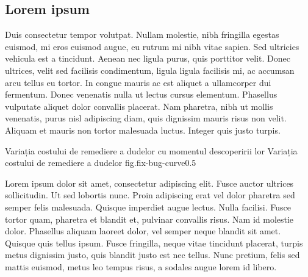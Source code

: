 \subsection{Lorem ipsum}

Duis consectetur tempor volutpat. Nullam molestie, nibh fringilla egestas
euismod, mi eros euismod augue, eu rutrum mi nibh vitae sapien. Sed ultricies
vehicula est a tincidunt. Aenean nec ligula purus, quis porttitor velit. Donec
ultrices, velit sed facilisis condimentum, ligula ligula facilisis mi, ac
accumsan arcu tellus eu tortor. In congue mauris ac est aliquet a ullamcorper
dui fermentum. Donec venenatis nulla ut lectus cursus elementum. Phasellus
vulputate aliquet dolor convallis placerat. Nam pharetra, nibh ut mollis
venenatis, purus nisl adipiscing diam, quis dignissim mauris risus non velit.
Aliquam et mauris non tortor malesuada luctus. Integer quis justo turpis.


%
	{Variația costului de remediere a dudelor cu momentul descoperirii
	lor}%
	{Variația costului de remediere a dudelor}%
	{fig.fix-bug-curve}{0.5}

Lorem ipsum dolor sit amet, consectetur adipiscing elit. Fusce auctor ultrices
sollicitudin. Ut sed lobortis nunc. Proin adipiscing erat vel dolor pharetra
sed semper felis malesuada. Quisque imperdiet augue lectus. Nulla facilisi.
Fusce tortor quam, pharetra et blandit et, pulvinar convallis risus. Nam id
molestie dolor. Phasellus aliquam laoreet dolor, vel semper neque blandit sit
amet. Quisque quis tellus ipsum. Fusce fringilla, neque vitae tincidunt
placerat, turpis metus dignissim justo, quis blandit justo est nec tellus. Nunc
pretium, felis sed mattis euismod, metus leo tempus risus, a sodales augue
lorem id libero.


